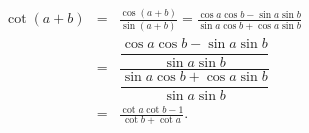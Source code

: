 
 \begin{eqnarray*}
 \cot (a+b) &=&\frac{\cos (a+b)}{\sin (a+b)}=\frac{\cos a\cos b-\sin a\sin b}{
 \sin a\cos b+\cos a\sin b} \\
 &=&\dfrac{\dfrac{\cos a\cos b-\sin a\sin b}{\sin a\sin b}}{\dfrac{\sin a\cos
 b+\cos a\sin b}{\sin a\sin b}} \\
 &=&\frac{\cot a\cot b-1}{\cot b+\cot a}.
 \end{eqnarray*}
 
